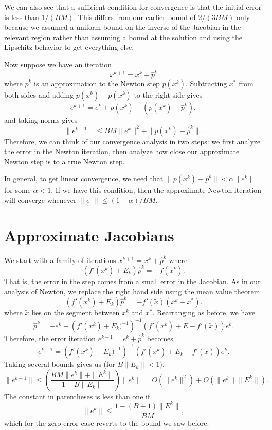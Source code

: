 \documentclass[12pt, leqno]{article} %
\begin{document}
We can also see that a sufficient condition for convergence is that
the initial error is less than $1/(BM)$.  This differs from our
earlier bound of $2/(3BM)$ only because we assumed a uniform bound on
the inverse of the Jacobian in the relevant region rather than
assuming a bound at the solution and using the Lipschitz behavior to
get everything else.

Now suppose we have an iteration
\[
  x^{k+1} = x^k + \hat{p}^k
\]
where $\hat{p}^k$ is an approximation to the Newton step $p(x^k)$.
Subtracting $x^*$ from both sides and adding $p(x^k)-p(x^k)$ to the
right side gives
\[
  e^{k+1} = e^k + p(x^k) - (p(x^k)-\hat{p}^k),
\]
and taking norms gives
\[
  \|e^{k+1}\| \leq BM \|e^k\|^2 + \|p(x^k)-\hat{p}^k\|.
\]
Therefore, we can think of our convergence analysis in two steps:
we first analyze the error in the Newton iteration, then analyze
how close our approximate Newton step is to a true Newton step.

In general, to get linear convergence, we need that
$\|p(x^k)-\hat{p}^k\| < \alpha \|e^k\|$ for some $\alpha < 1$.  If we
have this condition, then the approximate Newton iteration will
converge whenever $\|e^0\| \leq (1-\alpha)/BM$.

\section*{Approximate Jacobians}

We start with a family of iterations $x^{k+1} = x^k + \hat{p}^k$ where
\[
  (f'(x^k)+E_k) \hat{p}^k = -f(x^k).
\]
That is, the error in the step comes from a small error in the
Jacobian.  As in our analysis of Newton, we replace the right hand
side using the mean value theorem
\[
  (f'(x^k)+E_k) \hat{p}^k = -f'(\tilde{x})(x^k-x^*).  
\]
where $\tilde{x}$ lies on the segment between $x^k$ and $x^*$.
Rearranging as before, we have
\[
  \hat{p}^k =
    -e^k +
    \left( f'(x^k)+E_k)^{-1} \right)^{-1}
    \left(f'(x^k) + E - f'(\tilde{x}) \right) e^k.
\]
Therefore, the error iteration $e^{k+1} = e^k + \hat{p}^k$ becomes
\[
  e^{k+1} =
    \left( f'(x^k)+E_k)^{-1} \right)^{-1}
    \left(f'(x^k) + E_k - f'(\tilde{x}) \right) e^k.
\]
Taking several bounds gives us (for $B \|E_k\| < 1$),
\[
  \|e^{k+1}\| \leq \left( \frac{BM\|e^k\| + \|E^k\|}{1-B\|E_k\|} \right) \|e^k\|
  = O(\|e^k\|^2) + O(\|e^k\| \|E^k\|).
\]
The constant in parentheses is less than one if
\[
  \|e^k\| \leq \frac{1-(B+1)\|E^k\|}{BM},
\]
which for the zero error case reverts to the bound we saw before.
\end{document}
